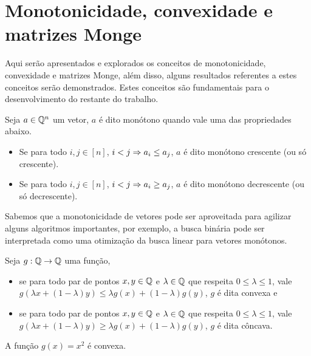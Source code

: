 \section{Monotonicidade, convexidade e matrizes Monge}
\label{MatrizMonge}


Aqui serão apresentados e explorados os conceitos de monotonicidade, convexidade e matrizes Monge, além disso, alguns resultados referentes a estes conceitos serão demonstrados. Estes conceitos são fundamentais para o desenvolvimento do restante do trabalho.

\begin{defi}
Seja $a \in \mathbb{Q}^n$ um vetor, $a$ é dito monótono quando vale uma das propriedades abaixo.
    \begin{itemize}
        \item Se para todo $i,j \in [n]$, $i < j \Rightarrow a_i \leq a_j$, $a$ é dito monótono crescente (ou só crescente).
        \item Se para todo $i,j \in [n]$, $i < j \Rightarrow a_i \geq a_j$, $a$ é dito monótono decrescente (ou só decrescente).
    \end{itemize}
\end{defi}

Sabemos que a monotonicidade de vetores pode ser aproveitada para agilizar alguns algoritmos importantes, por exemplo, a busca binária pode ser interpretada como uma otimização da busca linear para vetores monótonos. 

\begin{defi}
Seja $g : \mathbb{Q} \to \mathbb{Q}$ uma função,
    \begin{itemize}
        \item se para todo par de pontos $x,y \in \mathbb{Q}$ e $\lambda \in \mathbb{Q}$ que respeita $0 \leq \lambda \leq 1$, vale~${g(\lambda x + (1 - \lambda)y) \leq \lambda g(x) + (1 - \lambda) g(y)}$, $g$ é dita convexa e 
        \item se para todo par de pontos $x,y \in \mathbb{Q}$ e $\lambda \in \mathbb{Q}$ que respeita $0 \leq \lambda \leq 1$, vale~${g(\lambda x + (1 - \lambda)y) \geq \lambda g(x) + (1 - \lambda) g(y)}$, $g$ é dita côncava.
    \end{itemize}
\end{defi}

\begin{prop} \label{prop:sqConv}
A função $g(x) = x^2$ é convexa. 
\end{prop}

